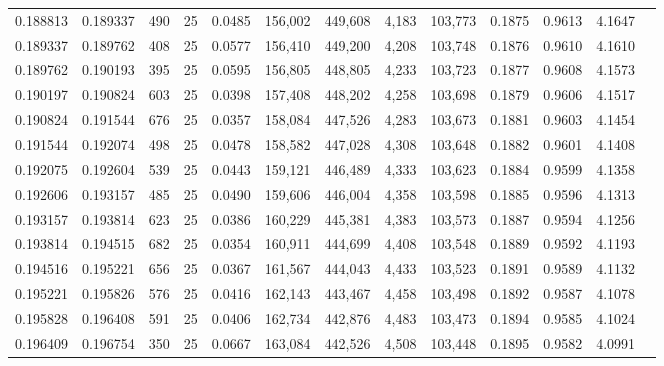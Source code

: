 \begin{tabular}{rrrrrrrrrrrrr}
0.188813 & 0.189337 &   490 &  25 &                                     0.0485 & 156,002 & 449,608 &   4,183 & 103,773 & 0.1875 & 0.9613 & 4.1647 \\
0.189337 & 0.189762 &   408 &  25 &                                     0.0577 & 156,410 & 449,200 &   4,208 & 103,748 & 0.1876 & 0.9610 & 4.1610 \\
0.189762 & 0.190193 &   395 &  25 &                                     0.0595 & 156,805 & 448,805 &   4,233 & 103,723 & 0.1877 & 0.9608 & 4.1573 \\
0.190197 & 0.190824 &   603 &  25 &                                     0.0398 & 157,408 & 448,202 &   4,258 & 103,698 & 0.1879 & 0.9606 & 4.1517 \\
0.190824 & 0.191544 &   676 &  25 &                                     0.0357 & 158,084 & 447,526 &   4,283 & 103,673 & 0.1881 & 0.9603 & 4.1454 \\
0.191544 & 0.192074 &   498 &  25 &                                     0.0478 & 158,582 & 447,028 &   4,308 & 103,648 & 0.1882 & 0.9601 & 4.1408 \\
0.192075 & 0.192604 &   539 &  25 &                                     0.0443 & 159,121 & 446,489 &   4,333 & 103,623 & 0.1884 & 0.9599 & 4.1358 \\
0.192606 & 0.193157 &   485 &  25 &                                     0.0490 & 159,606 & 446,004 &   4,358 & 103,598 & 0.1885 & 0.9596 & 4.1313 \\
0.193157 & 0.193814 &   623 &  25 &                                     0.0386 & 160,229 & 445,381 &   4,383 & 103,573 & 0.1887 & 0.9594 & 4.1256 \\
0.193814 & 0.194515 &   682 &  25 &                                     0.0354 & 160,911 & 444,699 &   4,408 & 103,548 & 0.1889 & 0.9592 & 4.1193 \\
0.194516 & 0.195221 &   656 &  25 &                                     0.0367 & 161,567 & 444,043 &   4,433 & 103,523 & 0.1891 & 0.9589 & 4.1132 \\
0.195221 & 0.195826 &   576 &  25 &                                     0.0416 & 162,143 & 443,467 &   4,458 & 103,498 & 0.1892 & 0.9587 & 4.1078 \\
0.195828 & 0.196408 &   591 &  25 &                                     0.0406 & 162,734 & 442,876 &   4,483 & 103,473 & 0.1894 & 0.9585 & 4.1024 \\
0.196409 & 0.196754 &   350 &  25 &                                     0.0667 & 163,084 & 442,526 &   4,508 & 103,448 & 0.1895 & 0.9582 & 4.0991 \\

\end{tabular}
